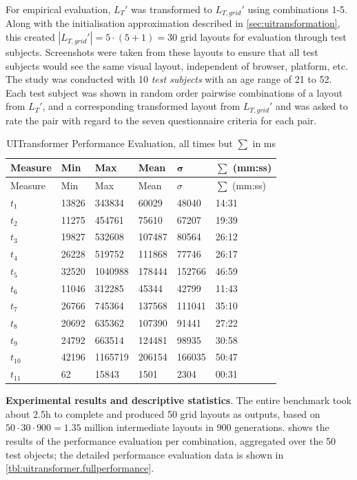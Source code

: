 For empirical evaluation, \(L_T'\) was transformed to \(L_{T, grid}'\) using combinations 1-5.
Along with the initialisation approximation described in \cref{sec:uitransformation}, this created \(|L_{T, grid}'| = 5 \cdot(5+1)=30\) grid layouts for evaluation through test subjects.
Screenshots were taken from these layouts to ensure that all test subjects would see the same visual layout, independent of browser, platform, etc.
The study was conducted with 10 \emph{test subjects} with an age range of 21 to 52.
Each test subject was shown in random order pairwise combinations of a  layout from \(L_T'\), and a corresponding transformed layout from \(L_{T, grid}'\) and was asked to rate the pair with regard to the seven questionnaire criteria for each pair.

\begin{longtable}[hbt]{@{}llllll@{}}
\caption[UITransformer Performance Evaluation]{\label{tbl:uitransformer.performance}UITransformer Performance Evaluation, all times but \(\sum\) in ms}\tabularnewline
\toprule
\textbf{Measure} & \textbf{Min} & \textbf{Max} & \textbf{Mean} & \(\bm{\sigma}\) & \(\bm{\sum}\) (mm:ss)\tabularnewline
\midrule
\endfirsthead
\toprule
Measure & Min & Max & Mean & \(\sigma\) & \(\sum\) (mm:ss)\tabularnewline
\midrule
\endhead
\(t_1\) & 13826 & 343834 & 60029 & 48040 & 14:31\tabularnewline
\(t_2\) & 11275 & 454761 & 75610 & 67207 & 19:39\tabularnewline
\(t_3\) & 19827 & 532608 & 107487 & 80564 & 26:12\tabularnewline
\(t_4\) & 26228 & 519752 & 111868 & 77746 & 26:17\tabularnewline
\(t_5\) & 32520 & 1040988 & 178444 & 152766 & 46:59\tabularnewline
\(t_6\) & 11046 & 312285 & 45344 & 42799 & 11:43\tabularnewline
\(t_7\) & 26766 & 745364 & 137568 & 111041 & 35:10\tabularnewline
\(t_8\) & 20692 & 635362 & 107390 & 91441 & 27:22\tabularnewline
\(t_9\) & 24792 & 663514 & 124481 & 98935 & 30:58\tabularnewline
\(t_{10}\) & 42196 & 1165719 & 206154 & 166035 & 50:47\tabularnewline
\(t_{11}\) & 62 & 15843 & 1501 & 2304 & 00:31\tabularnewline
\bottomrule
\end{longtable}
\textbf{Experimental results and descriptive statistics}.
The entire benchmark took about 2.5h to complete and produced 50 grid layouts as outputs, based on \(50\cdot 30\cdot 900 = 1.35\) million intermediate layouts in 900 generations.
 shows the results of the performance evaluation per combination, aggregated over the 50 test objects; the detailed performance evaluation data is shown in \cref{tbl:uitransformer.fullperformance}.
\hypertarget{tbl:uitransformer.performance}{}


